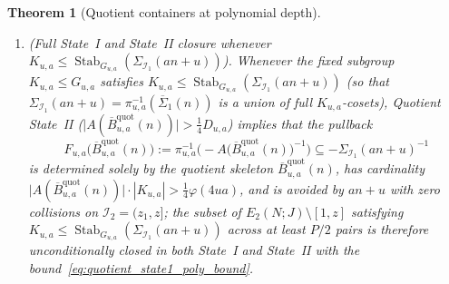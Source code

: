 \documentclass[11pt, a4paper]{article}
\theoremstyle{plain}
\newtheorem{theorem}{Theorem}[section]
\theoremstyle{definition}
\begin{document}
\begin{theorem}[Quotient containers at polynomial depth]
\begin{enumerate}[label=(\alph*)]
    \item \emph{(Full State~I and State~II closure whenever $K_{u,a}\le\operatorname{Stab}_{G_{u,a}}(\Sigma_{\mathcal{I}_1}(an+u))$).} 
    Whenever the fixed subgroup $K_{u,a}\le G_{u,a}$ satisfies $K_{u,a}\le\allowbreak\operatorname{Stab}_{G_{u,a}}(\Sigma_{\mathcal{I}_1}(an+u))$ (so that $\Sigma_{\mathcal{I}_1}(an+u)=\allowbreak\pi_{u,a}^{-1}(\overline{\Sigma}_1(n))$ is a union of full $K_{u,a}$-cosets), Quotient State~II ($\big|A(\overline{B}_{u,a}^{\mathrm{quot}}(n))\big|>\allowbreak\frac14 D_{u,a}$) implies that the pullback 
    \[
    F_{u,a}\big(\overline{B}_{u,a}^{\mathrm{quot}}(n)\big):=\pi_{u,a}^{-1}\Big(-A\big(\overline{B}_{u,a}^{\mathrm{quot}}(n)\big)^{-1}\Big)\subseteq-\Sigma_{\mathcal{I}_1}(an+u)^{-1}
    \]
    is determined solely by the quotient skeleton $\overline{B}_{u,a}^{\mathrm{quot}}(n)$, has cardinality $\big|A(\overline{B}_{u,a}^{\mathrm{quot}}(n))\big|\cdot|K_{u,a}|>\frac14\varphi(4ua)$, and is avoided by $an+u$ with zero collisions on $\mathcal{I}_2=(z_1,z]$; the subset of $E_2(N;J)\setminus[1,z]$ satisfying $K_{u,a}\le\allowbreak\operatorname{Stab}_{G_{u,a}}(\Sigma_{\mathcal{I}_1}(an+u))$ across at least $P/2$ pairs is therefore unconditionally closed in both State~I and State~II with the bound~\eqref{eq:quotient_state1_poly_bound}.
\end{enumerate}
\end{theorem}
\end{document}

